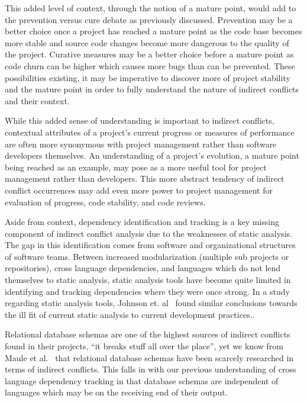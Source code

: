 \documentclass[conference]{IEEEtran}
\begin{document}
This added level of context, through the notion of a mature point,
would add to the prevention versus cure debate as previously discussed. Prevention may be a better
choice once a project has reached a mature point as the code base becomes more stable and source code changes become more dangerous
to the quality of the project. Curative measures may be a better choice before a mature point as code churn can be higher which
causes more bugs than can be prevented. These possibilities existing, it may be imperative to discover more of project stability
and the mature point in order to fully understand the nature of indirect conflicts and their context.

While this added sense of understanding is important to indirect conflicts, contextual attributes of a project's current progress
or measures of performance are often more synonymous with project management
rather than software developers themselves. An understanding of a project's evolution, a mature point being reached as an example,
may pose as a more useful tool for project management rather than developers. This more abstract tendency of indirect
conflict occurrences may add even more power to project management for evaluation of progress, code stability, and code reviews.

Aside from context, dependency identification and tracking is a key missing component of
indirect conflict analysis due to the weaknesses of static analysis. The gap in this identification comes from software and
organizational structures of software teams. Between increased modularization (multiple sub projects or repositories),
cross language dependencies, and languages which do not lend themselves to static analysis, static analysis tools have
become quite limited in identifying and tracking dependencies where they were once strong.
In a study regarding static analysis tools, Johnson et. al~\cite{Johnson:2013:WDS} found similar conclusions towards the
ill fit of current static analysis to current development practices..

Relational database schemas are one of the highest sources of indirect
conflicts found in their projects, ``it breaks stuff all over the place'',
yet we know from Maule et al.~\cite{Maule:2008:IAD} that relational database schemas have
been scarcely researched in terms of indirect conflicts. This falls in with our previous understanding of cross language
dependency tracking in that database schemas are independent of languages which may be on the receiving end of their output.
\end{document}
